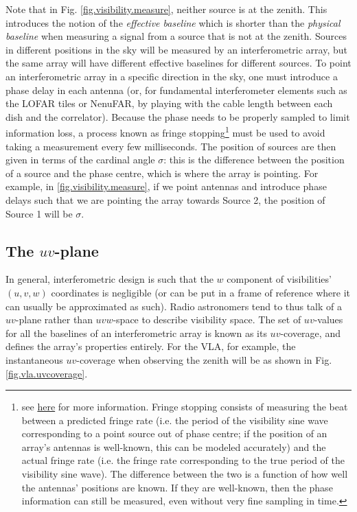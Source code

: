 \pg
Note that in Fig. \ref{fig.visibility.measure}, neither source is at the zenith. This introduces the notion of the \emph{effective baseline} which is shorter than the \emph{physical baseline} when measuring a signal from a source that is not at the zenith. Sources in different positions in the sky will be measured by an interferometric array, but the same array will have different effective baselines for different sources. To point an interferometric array in a specific direction in the sky, one must introduce a phase delay in each antenna (or, for fundamental interferometer elements such as the LOFAR tiles or NenuFAR, by playing with the cable length between each dish and the correlator). Because the phase needs to be properly sampled to limit information loss, a process known as fringe stopping\footnote{see \href{https://casper.berkeley.edu/astrobaki/index.php/Fringe_Stopping}{here} for more information. Fringe stopping consists of measuring the beat between a predicted fringe rate (i.e. the period of the visibility sine wave corresponding to a point source out of phase centre; if the position of an array's antennas is well-known, this can be modeled accurately) and the actual fringe rate (i.e. the fringe rate corresponding to the true period of the visibility sine wave). The difference between the two is a function of how well the antennas' positions are known. If they are well-known, then the phase information can still be measured, even without very fine sampling in time. } must be used to avoid taking a measurement every few milliseconds. The position of sources are then given in terms of the cardinal angle $\sigma$: this is the difference between the position of a source and the phase centre, which is where the array is pointing. For example, in \cref{fig.visibility.measure}, if we point antennas and introduce phase delays such that we are pointing the array towards Source 2, the position of Source 1 will be $\sigma$.


\subsection{The $uv$-plane}

\pg
In general, interferometric design is such that the $w$ component of visibilities' $(u,v,w)$ coordinates is negligible (or can be put in a frame of reference where it can usually be approximated as such). Radio astronomers tend to thus talk of a $uv$-plane rather than $uvw$-space to describe visibility space. The set of $uv$-values for all the baselines of an interferometric array is known as its $uv$-coverage, and defines the array's properties entirely.
For the VLA, for example, the instantaneous $uv$-coverage when observing the zenith will be as shown in Fig. \ref{fig.vla.uvcoverage}.

